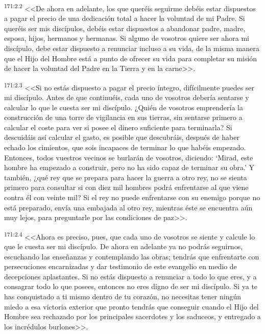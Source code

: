 \par 
\textsuperscript{171:2.2} <<De ahora en adelante, los que queréis seguirme debéis estar dispuestos a pagar el precio de una dedicación total a hacer la voluntad de mi Padre. Si queréis ser mis discípulos, debéis estar dispuestos a abandonar padre, madre, esposa, hijos, hermanos y hermanas. Si alguno de vosotros quiere ser ahora mi discípulo, debe estar dispuesto a renunciar incluso a su vida, de la misma manera que el Hijo del Hombre está a punto de ofrecer su vida para completar su misión de hacer la voluntad del Padre en la Tierra y en la carne>>.

\par 
\textsuperscript{171:2.3} <<Si no estás dispuesto a pagar el precio íntegro, difícilmente puedes ser mi discípulo. Antes de que continuéis, cada uno de vosotros debería sentarse y calcular lo que le cuesta ser mi discípulo. ¿Quién de vosotros emprendería la construcción de una torre de vigilancia en sus tierras, sin sentarse primero a calcular el coste para ver si posee el dinero suficiente para terminarla? Si descuidáis así calcular el gasto, es posible que descubráis, después de haber echado los cimientos, que sois incapaces de terminar lo que habéis empezado. Entonces, todos vuestros vecinos se burlarán de vosotros, diciendo: `Mirad, este hombre ha empezado a construir, pero no ha sido capaz de terminar su obra.' Y también, ¿qué rey que se prepara para hacer la guerra a otro rey, no se sienta primero para consultar si con diez mil hombres podrá enfrentarse al que viene contra él con veinte mil? Si el rey no puede enfrentarse con su enemigo porque no está preparado, envía una embajada al otro rey, mientras éste se encuentra aún muy lejos, para preguntarle por las condiciones de paz>>.

\par 
\textsuperscript{171:2.4} <<Ahora es preciso, pues, que cada uno de vosotros se siente y calcule lo que le cuesta ser mi discípulo. De ahora en adelante ya no podrás seguirnos, escuchando las enseñanzas y contemplando las obras; tendrás que enfrentarte con persecuciones encarnizadas y dar testimonio de este evangelio en medio de decepciones aplastantes. Si no estás dispuesto a renunciar a todo lo que eres, y a consagrar todo lo que posees, entonces no eres digno de ser mi discípulo. Si ya te has conquistado a ti mismo dentro de tu corazón, no necesitas tener ningún miedo a esa victoria exterior que pronto tendrás que conseguir cuando el Hijo del Hombre sea rechazado por los principales sacerdotes y los saduceos, y entregado a los incrédulos burlones>>.

